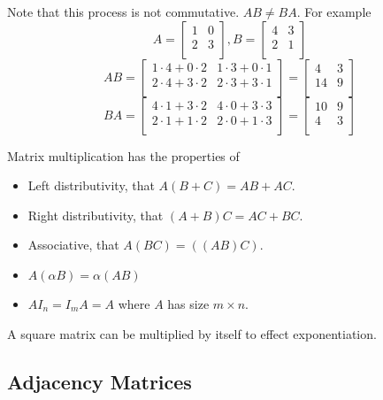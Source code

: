\documentclass[12pt]{report}
\begin{document}
\begin{flushleft}
Note that this process is not commutative. \(AB \neq BA\). For example
\[
    A =
    \left[\begin{array}{cc}
        1 & 0 \\
        2 & 3 \\
    \end{array}\right]
    , B =
    \left[\begin{array}{cc}
        4 & 3 \\
        2 & 1 \\
    \end{array}\right]
\]
\[
    AB =
    \left[\begin{array}{cc}
        1 \cdot 4 + 0 \cdot 2 & 1 \cdot 3 + 0 \cdot 1 \\
        2 \cdot 4 + 3 \cdot 2 & 2 \cdot 3 + 3 \cdot 1 \\
    \end{array}\right]
    =
    \left[\begin{array}{cc}
        4 & 3 \\
        14 & 9 \\
    \end{array}\right]
\]
\[
    BA =
    \left[\begin{array}{cc}
        4 \cdot 1 + 3 \cdot 2 & 4 \cdot 0 + 3 \cdot 3 \\
        2 \cdot 1 + 1 \cdot 2 & 2 \cdot 0 + 1 \cdot 3 \\
    \end{array}\right]
    =
    \left[\begin{array}{cc}
        10 & 9 \\
        4 & 3 \\
    \end{array}\right]
\]

Matrix multiplication has the properties of
\begin{itemize}
    \item Left distributivity, that \(A(B + C) = AB + AC\).
    \item Right distributivity, that \((A + B)C = AC + BC\).
    \item Associative, that \(A(BC) = ((AB)C)\).
    \item \(A(\alpha B) = \alpha(AB)\)
    \item \(AI_n = I_mA = A\) where \(A\) has size \(m \times n\).
\end{itemize}
A square matrix can be multiplied by itself to effect exponentiation.

\subsection*{Adjacency Matrices}


\end{flushleft}
\end{document}
